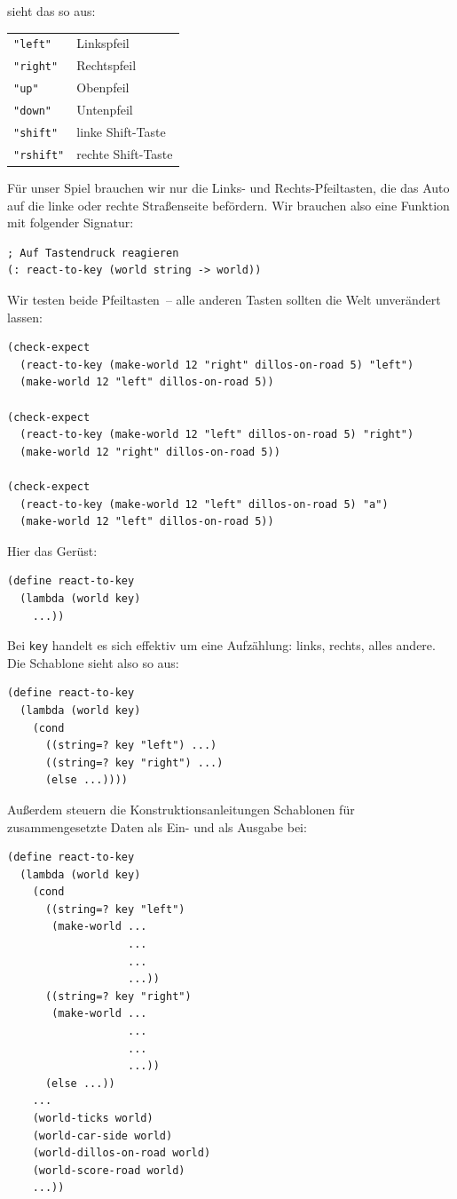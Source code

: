sieht das so aus:
%
\begin{center}
  \begin{tabular}{l|l}
    {\lstinline!"left"!} & Linkspfeil\\
    {\lstinline!"right"!} & Rechtspfeil\\
    {\lstinline!"up"!} & Obenpfeil\\
    {\lstinline!"down"!} & Untenpfeil\\
    {\lstinline!"shift"!} & linke Shift-Taste\\
    {\lstinline!"rshift"!} & rechte Shift-Taste
  \end{tabular}
\end{center}
%
Für unser Spiel brauchen wir nur die Links- und Rechts-Pfeiltasten,
die das Auto auf die linke oder rechte Straßenseite befördern.   Wir
brauchen also eine Funktion mit folgender Signatur:
%
\begin{lstlisting}
; Auf Tastendruck reagieren
(: react-to-key (world string -> world))
\end{lstlisting}
%
Wir testen beide Pfeiltasten~-- alle anderen Tasten sollten die Welt
unverändert lassen:
%
\begin{lstlisting}
(check-expect
  (react-to-key (make-world 12 "right" dillos-on-road 5) "left")
  (make-world 12 "left" dillos-on-road 5))

(check-expect
  (react-to-key (make-world 12 "left" dillos-on-road 5) "right")
  (make-world 12 "right" dillos-on-road 5))
              
(check-expect
  (react-to-key (make-world 12 "left" dillos-on-road 5) "a")
  (make-world 12 "left" dillos-on-road 5))
\end{lstlisting}
%
Hier das Gerüst:
%
\begin{lstlisting}
(define react-to-key
  (lambda (world key)
    ...))
\end{lstlisting}
%
Bei \lstinline{key} handelt es sich effektiv um eine Aufzählung:
links, rechts, alles andere.  Die Schablone sieht also so aus:
%
\begin{lstlisting}
(define react-to-key
  (lambda (world key)
    (cond
      ((string=? key "left") ...)
      ((string=? key "right") ...)
      (else ...))))
\end{lstlisting}
%
Außerdem steuern die Konstruktionsanleitungen Schablonen für
zusammengesetzte Daten als Ein- und als Ausgabe bei:
%
\begin{lstlisting}
(define react-to-key
  (lambda (world key)
    (cond
      ((string=? key "left")
       (make-world ...
                   ...
                   ...
                   ...))
      ((string=? key "right")
       (make-world ...
                   ...
                   ...
                   ...))
      (else ...))
    ...
    (world-ticks world)
    (world-car-side world)
    (world-dillos-on-road world)
    (world-score-road world)
    ...))
\end{lstlisting}
